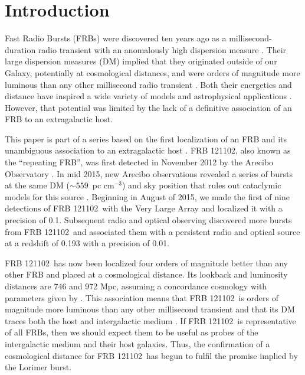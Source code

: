 \documentclass[twocolumn]{aastex61}
\newcommand{\frb}{FRB 121102}
\begin{document}
\section{Introduction}

Fast Radio Bursts (FRBs) were discovered ten years ago as a millisecond-duration radio transient with an anomalously high dispersion measure \citep[the ``Lorimer burst'';][]{2007Sci...318..777L}. Their large dispersion measures (DM) implied that they originated outside of our Galaxy, potentially at cosmological distances, and were orders of magnitude more luminous than any other millisecond radio transient \citep{2013Sci...341...53T}. Both their energetics and distance have inspired a wide variety of models and astrophysical applications \citep[e.g.,][]{2014ApJ...780L..33M, 2014ApJ...797...70K, 2016MNRAS.458L..19C, 2016MNRAS.457..232C}. However, that potential was limited by the lack of a definitive association of an FRB to an extragalactic host.

This paper is part of a series based on the first localization of an FRB and its unambiguous association to an extragalactic host \citep{LOC, OPT, EVN}. \frb, also known as the ``repeating FRB'', was first detected in November 2012 by the Arecibo Observatory \citep{2014ApJ...790..101S}. In mid 2015, new Arecibo observations revealed a series of bursts at the same DM ($\sim559$\ pc cm$^{-3}$) and sky position that rules out cataclymic models for this source \citep{2016Natur.531..202S}. Beginning in August of 2015, we made the first of nine detections of \frb\ with the Very Large Array \citep{LOC} and localized it with a precision of 0.1\arcsec. Subsequent radio and optical observing discovered more bursts from \frb\ and associated them with a persistent radio and optical source at a redshift of 0.193 with a precision of 0.01\arcsec \citep[$\sim40$\ pc]{OPT, EVN}.

\frb\ has now been localized four orders of magnitude better than any other FRB and placed at a cosmological distance. Its lookback and luminosity distances are 746 and 972 Mpc, assuming a concordance cosmology with parameters given by \citet{2016A&A...594A..13P}. This association means that \frb\ is orders of magnitude more luminous than any other millisecond transient and that its DM traces both the host and intergalactic medium \citep{OPT}. If \frb\ is representative of all FRBs, then we should expect them to be useful as probes of the intergalactic medium and their host galaxies. Thus, the confirmation of a cosmological distance for \frb\ has begun to fulfil the promise implied by the Lorimer burst.
\end{document}
